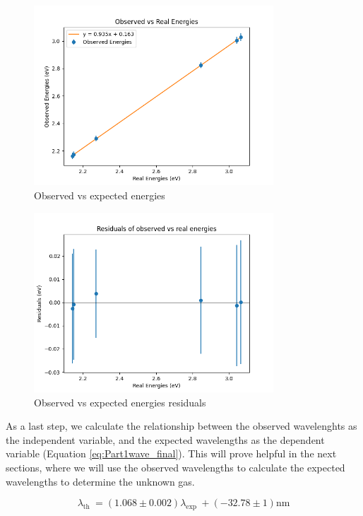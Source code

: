 \begin{figure}[H]
    \centering
    \includegraphics[width=0.8\textwidth]{Results/Sections/Part1/Part1_energy_observed_vs_expected.png}
    \caption{Observed vs expected energies}
    \label{fig:Part1energy}
\end{figure}

\begin{figure}
    \centering
    \includegraphics[width=0.8\textwidth]{Results/Sections/Part1/Part1_energy_observed_vs_expected_residuals.png}
    \caption{Observed vs expected energies residuals}
    \label{fig:Part1energyU}
\end{figure}

As a last step, we calculate the relationship between the observed wavelenghts as the independent variable, and the expected wavelengths as the dependent variable (Equation \ref{eq:Part1wave_final}).
This will prove helpful in the next sections, where we will use the observed wavelengths to calculate the expected wavelengths to determine the unknown gas.

\begin{equation}
    \label{eq:Part1wave_final}
    \lambda_{\text {th }} = (1.068 \pm 0.002) \lambda_{\text {exp }} + (- 32.78 \pm 1) \text{nm}
\end{equation}


